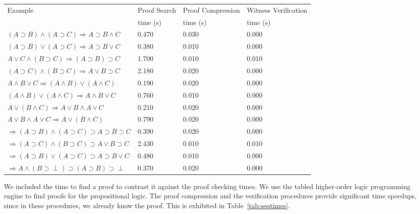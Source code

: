 \documentclass{llncs}
\begin{document}
\begin{table*}[htbp]
\begin{center}
\begin{small}
\begin{tabular}{|l|l|l|l|}
\hline
Example  & Proof Search 
& Proof Compression & Witness Verification \\
& time (s) & time (s) & time (s)\\
\hline
$(A\supset B)\wedge (A\supset C)\Rightarrow A\supset B\wedge C$
&       0.470 
&       0.030 
&       0.000 \\
$(A\supset B)\vee (A\supset C)\Rightarrow A\supset B\vee C$
&       0.380 
&       0.010 
&       0.000 \\
$A\vee C\wedge (B\supset C)\Rightarrow (A\supset B)\supset C$
&       1.700 
&       0.010 
&       0.010 \\
$(A\supset C)\wedge (B\supset C)\Rightarrow A\vee B\supset C$
&       2.180 
&       0.020 
&       0.000 \\
$A\wedge B\vee C\Rightarrow (A\wedge B)\vee (A\wedge C)$
&       0.190 
&       0.020 
&       0.000 \\
$(A\wedge B)\vee (A\wedge C)\Rightarrow A\wedge B\vee C$
&       0.760 
&       0.010 
&       0.000 \\
$A\vee (B\wedge C)\Rightarrow A\vee B\wedge A\vee C$
&       0.210 
&       0.020 
&       0.000 \\
$A\vee B\wedge A\vee C\Rightarrow A\vee (B\wedge C)$
&       0.790 
&       0.020 
&       0.000 \\
$\Rightarrow (A\supset B)\wedge (A\supset C)\supset A\supset B\supset C$
&       0.390 
&       0.020 
&       0.000 \\
$\Rightarrow (A\supset C)\wedge (B\supset C)\supset A\vee B\supset C$
&       2.430 
&       0.010 
&       0.010 \\
$\Rightarrow (A\supset B)\vee (A\supset C)\supset A\supset B\vee C$
&       0.480 
&       0.010 
&       0.000 \\
$\Rightarrow A\wedge (B\supset \perp)\supset (A\supset B)\supset \perp$ 
&       0.370 
&       0.020 
&       0.000 \\
\hline
\end{tabular}
\end{small}
\end{center}
\caption{\label{tab:seqtimes}
Sequent Calculus: Times with Caching of User-Selected Predicates}
\end{table*}

We included the time to find a proof to contrast it against the proof
checking times. We use the tabled higher-order logic programming
engine \cite{Pientka05,Pientka03Phd} to find proofs for the
propositional logic. The proof compression and the verification procedures
provide significant time speedups, since in these procedures, we already
know the proof. This is exhibited in Table~\ref{tab:seqtimes}.
\end{document}
